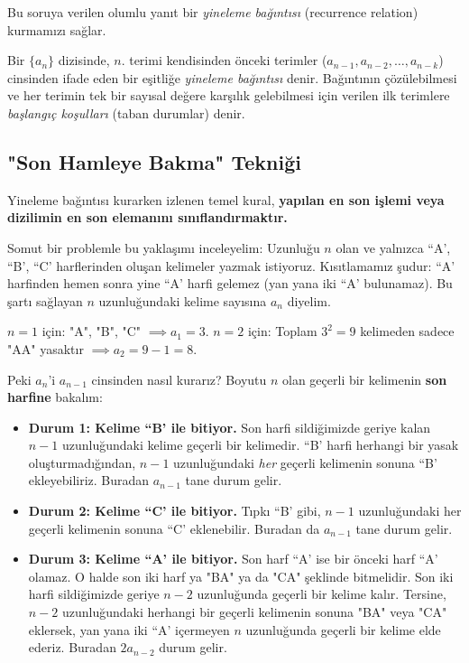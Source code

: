 Bu soruya verilen olumlu yanıt bir \emph{yineleme bağıntısı} (recurrence relation) kurmamızı sağlar.

\begin{definition}
Bir $\{a_n\}$ dizisinde, $n$. terimi kendisinden önceki terimler ($a_{n-1}, a_{n-2}, \dots, a_{n-k}$) cinsinden ifade eden bir eşitliğe \emph{yineleme bağıntısı} denir. Bağıntının çözülebilmesi ve her terimin tek bir sayısal değere karşılık gelebilmesi için verilen ilk terimlere \emph{başlangıç koşulları} (taban durumlar) denir.
\end{definition}

\subsection{"Son Hamleye Bakma" Tekniği}

Yineleme bağıntısı kurarken izlenen temel kural, \textbf{yapılan en son işlemi veya dizilimin en son elemanını sınıflandırmaktır.}

Somut bir problemle bu yaklaşımı inceleyelim:
Uzunluğu $n$ olan ve yalnızca ``A', ``B', ``C' harflerinden oluşan kelimeler yazmak istiyoruz. Kısıtlamamız şudur: ``A' harfinden hemen sonra yine ``A' harfi gelemez (yan yana iki ``A' bulunamaz). Bu şartı sağlayan $n$ uzunluğundaki kelime sayısına $a_n$ diyelim.

$n=1$ için: "A", "B", "C" $\implies a_1 = 3$.
$n=2$ için: Toplam $3^2 = 9$ kelimeden sadece "AA" yasaktır $\implies a_2 = 9 - 1 = 8$.

Peki $a_n$'i $a_{n-1}$ cinsinden nasıl kurarız? Boyutu $n$ olan geçerli bir kelimenin \textbf{son harfine} bakalım:
\begin{itemize}
    \item \textbf{Durum 1: Kelime ``B' ile bitiyor.}
    Son harfi sildiğimizde geriye kalan $n-1$ uzunluğundaki kelime geçerli bir kelimedir. ``B' harfi herhangi bir yasak oluşturmadığından, $n-1$ uzunluğundaki \emph{her} geçerli kelimenin sonuna ``B' ekleyebiliriz. Buradan $a_{n-1}$ tane durum gelir.
    
    \item \textbf{Durum 2: Kelime ``C' ile bitiyor.}
    Tıpkı ``B' gibi, $n-1$ uzunluğundaki her geçerli kelimenin sonuna ``C' eklenebilir. Buradan da $a_{n-1}$ tane durum gelir.
    
    \item \textbf{Durum 3: Kelime ``A' ile bitiyor.}
    Son harf ``A' ise bir önceki harf ``A' olamaz. O halde son iki harf ya "BA" ya da "CA" şeklinde bitmelidir. Son iki harfi sildiğimizde geriye $n-2$ uzunluğunda geçerli bir kelime kalır. Tersine, $n-2$ uzunluğundaki herhangi bir geçerli kelimenin sonuna "BA" veya "CA" eklersek, yan yana iki ``A' içermeyen $n$ uzunluğunda geçerli bir kelime elde ederiz. Buradan $2 a_{n-2}$ durum gelir.
\end{itemize}

